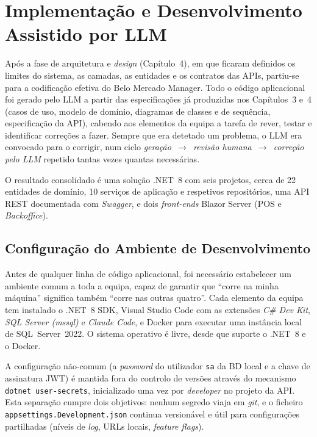 \chapter{Implementação e Desenvolvimento Assistido por LLM}

    Após a fase de arquitetura e \textit{design} (Capítulo~4), em que ficaram definidos os limites do sistema, as camadas, as entidades e os contratos das APIs, partiu-se para a codificação efetiva do Belo Mercado Manager. Todo o código aplicacional foi gerado pelo LLM a partir das especificações já produzidas nos Capítulos~3 e~4 (casos de uso, modelo de domínio, diagramas de classes e de sequência, especificação da API), cabendo aos elementos da equipa a tarefa de rever, testar e identificar correções a fazer. Sempre que era detetado um problema, o LLM era convocado para o corrigir, num ciclo \textit{geração~$\to$~revisão humana~$\to$~correção pelo LLM} repetido tantas vezes quantas necessárias.

    O resultado consolidado é uma solução .NET~8 com seis projetos, cerca de 22 entidades de domínio, 10 serviços de aplicação e respetivos repositórios, uma API REST documentada com \textit{Swagger}, e dois \textit{front-ends} Blazor Server (POS e \textit{Backoffice}).

\section{Configuração do Ambiente de Desenvolvimento}

    Antes de qualquer linha de código aplicacional, foi necessário estabelecer um ambiente comum a toda a equipa, capaz de garantir que ``corre na minha máquina'' significa também ``corre nas outras quatro''. Cada elemento da equipa tem instalado o .NET~8 SDK, Visual Studio Code com as extensões \textit{C\# Dev Kit}, \textit{SQL Server (mssql)} e \textit{Claude Code}, e Docker para executar uma instância local de SQL~Server~2022. O sistema operativo é livre, desde que suporte o .NET~8 e o Docker.

    A configuração não-comum (a \textit{password} do utilizador \texttt{sa} da BD local e a chave de assinatura JWT) é mantida fora do controlo de versões através do mecanismo \texttt{dotnet user-secrets}, inicializado uma vez por \textit{developer} no projeto da API. Esta separação cumpre dois objetivos: nenhum segredo viaja em \textit{git}, e o ficheiro \texttt{appsettings.Development.json} continua versionável e útil para configurações partilhadas (níveis de \textit{log}, URLs locais, \textit{feature flags}).


